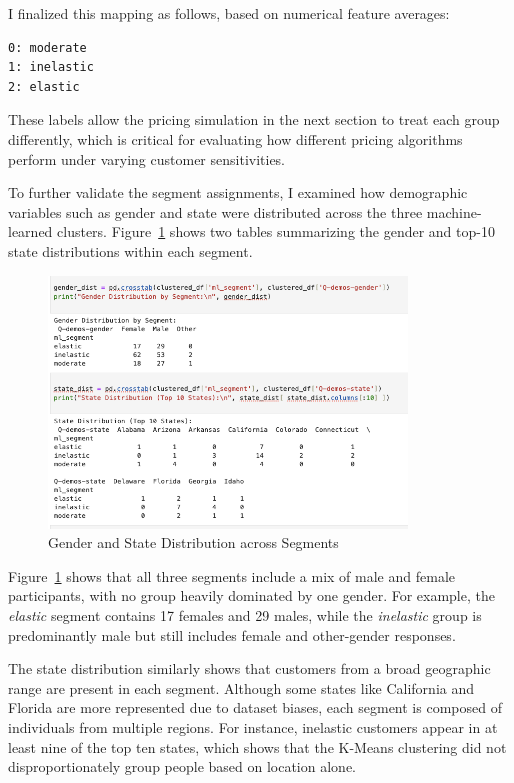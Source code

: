 \documentclass[12pt]{article}
\begin{document}
I finalized this mapping as follows, based on numerical feature averages:

\begin{verbatim}
0: moderate
1: inelastic
2: elastic
\end{verbatim}

These labels allow the pricing simulation in the next section to treat each group differently, which is critical for evaluating how different pricing algorithms perform under varying customer sensitivities.

To further validate the segment assignments, I examined how demographic variables such as gender and state were distributed across the three machine-learned clusters. Figure~\ref{fig:gender-state} shows two tables summarizing the gender and top-10 state distributions within each segment. 

\begin{figure}[h!]
  \centering
  \includegraphics[width=0.85\textwidth]{gender and state dist by segment.png}
  \caption{Gender and State Distribution across Segments}
  \label{fig:gender-state}
\end{figure}

Figure~\ref{fig:gender-state} shows that all three segments include a mix of male and female participants, with no group heavily dominated by one gender. For example, the \textit{elastic} segment contains 17 females and 29 males, while the \textit{inelastic} group is predominantly male but still includes female and other-gender responses.

The state distribution similarly shows that customers from a broad geographic range are present in each segment. Although some states like California and Florida are more represented due to dataset biases, each segment is composed of individuals from multiple regions. For instance, inelastic customers appear in at least nine of the top ten states, which shows that the K-Means clustering did not disproportionately group people based on location alone.
\end{document}
